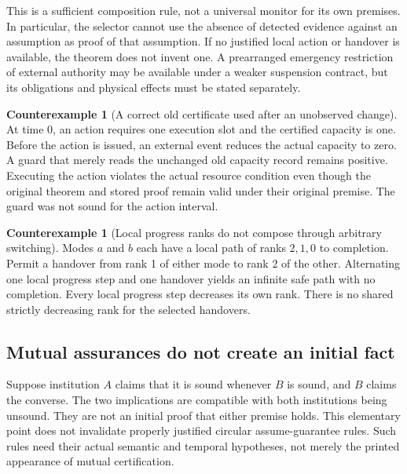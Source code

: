 \documentclass[11pt,letterpaper]{article}
\theoremstyle{plain}
\theoremstyle{definition}
\newtheorem{counterexample}[proposition]{Counterexample}
\theoremstyle{remark}
\begin{document}
This is a sufficient composition rule, not a universal monitor for its own premises. In particular, the selector cannot use the absence of detected evidence against an assumption as proof of that assumption. If no justified local action or handover is available, the theorem does not invent one. A prearranged emergency restriction of external authority may be available under a weaker suspension contract, but its obligations and physical effects must be stated separately.

\begin{counterexample}[A correct old certificate used after an unobserved change]\label{ex:stale-certificate}
At time $0$, an action requires one execution slot and the certified capacity is one. Before the action is issued, an external event reduces the actual capacity to zero. A guard that merely reads the unchanged old capacity record remains positive. Executing the action violates the actual resource condition even though the original theorem and stored proof remain valid under their original premise. The guard was not sound for the action interval.
\end{counterexample}

\begin{counterexample}[Local progress ranks do not compose through arbitrary switching]\label{ex:switching-rank}
Modes $a$ and $b$ each have a local path of ranks $2,1,0$ to completion. Permit a handover from rank 1 of either mode to rank 2 of the other. Alternating one local progress step and one handover yields an infinite safe path with no completion. Every local progress step decreases its own rank. There is no shared strictly decreasing rank for the selected handovers.
\end{counterexample}

\subsection{Mutual assurances do not create an initial fact}\label{sec:circular-assurance}

Suppose institution $A$ claims that it is sound whenever $B$ is sound, and $B$ claims the converse. The two implications are compatible with both institutions being unsound. They are not an initial proof that either premise holds. This elementary point does not invalidate properly justified circular assume-guarantee rules. Such rules need their actual semantic and temporal hypotheses, not merely the printed appearance of mutual certification.
\end{document}
